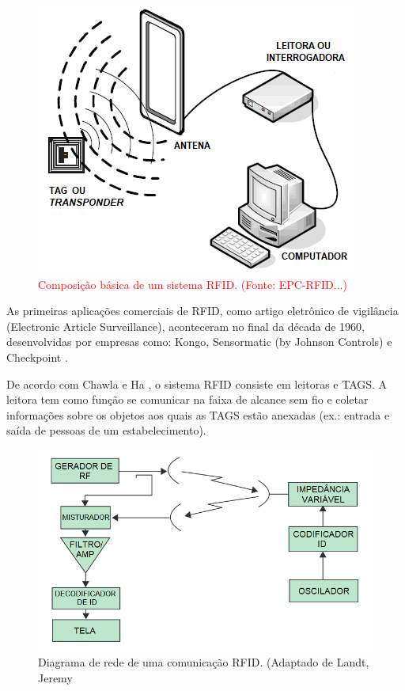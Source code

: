 \begin{figure}[H]
    \centering
    \includegraphics[width=0.6\linewidth]{figs/Fundamentos/Composicao.png}
    \caption{\textcolor{red}{Composição básica de um sistema RFID. (Fonte: EPC-RFID...)}}
    \label{fig:ComposicaoRFID}
\end{figure}


As primeiras aplicações comerciais de RFID, como artigo eletrônico de vigilância (Electronic Article Surveillance), aconteceram no final da década de 1960, desenvolvidas por empresas como: Kongo, Sensormatic (by Johnson Controls) e Checkpoint \cite{chawla2007overview}.

De acordo com Chawla e Ha \cite{chawla2007overview}, o sistema RFID consiste em leitoras e TAGS. A leitora tem como função se comunicar na faixa de alcance sem fio e coletar informações sobre os objetos aos quais as TAGS estão anexadas (ex.: entrada e saída de pessoas de um estabelecimento).

\begin{figure}[H]
    \centering
    \includegraphics[width=0.6\linewidth]{figs/Fundamentos/RFIDdiagram.png}
    \caption{Diagrama de rede de uma comunicação RFID. (Adaptado de Landt, Jeremy \cite{landt2005history}}
    \label{fig:DiagramaRFID}
\end{figure}

